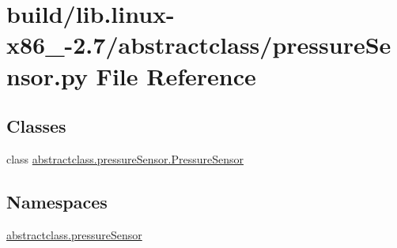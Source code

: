 \hypertarget{build_2lib_8linux-x86__64-2_87_2abstractclass_2pressureSensor_8py}{}\section{build/lib.linux-\/x86\+\_-\/2.7/abstractclass/pressure\+Sensor.py File Reference}
\label{build_2lib_8linux-x86__64-2_87_2abstractclass_2pressureSensor_8py}
\subsection*{Classes}
\begin{DoxyCompactItemize}
\item 
class \hyperlink{classabstractclass_1_1pressureSensor_1_1PressureSensor}{abstractclass.\+pressure\+Sensor.\+Pressure\+Sensor}
\end{DoxyCompactItemize}
\subsection*{Namespaces}
\begin{DoxyCompactItemize}
\item 
 \hyperlink{namespaceabstractclass_1_1pressureSensor}{abstractclass.\+pressure\+Sensor}
\end{DoxyCompactItemize}
